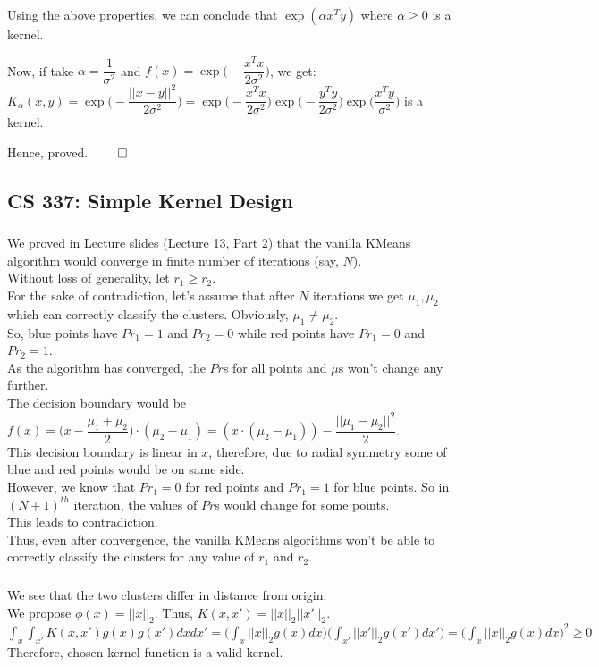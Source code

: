 \documentclass[12pt, fleqn]{article}
\begin{document}
Using the above properties, we can conclude that $\exp(\alpha x^T y)$ where $\alpha \ge 0$ is a kernel.

Now, if take $\alpha = \dfrac{1}{\sigma^2}$ and $f(x) = \exp\bigg(- \dfrac{x^T x}{2 \sigma^2}\bigg)$, we get: \\
$K_\alpha (x, y) = \exp\bigg(- \dfrac{||x - y||^2}{2 \sigma^2}\bigg) = \exp\bigg(- \dfrac{x^T x}{2 \sigma^2}\bigg) \exp\bigg(- \dfrac{y^T y}{2 \sigma^2}\bigg) \exp\bigg(\dfrac{x^T y}{\sigma^2}\bigg)$ is a kernel.

Hence, proved. \hfill $\qed$


\subsection{CS 337: Simple Kernel Design}
\subsubsection{}
We proved in Lecture slides (Lecture 13, Part 2) that the vanilla KMeans algorithm would converge in finite number of iterations (say, $N$). \\
Without loss of generality, let $r_1 \ge r_2$. \\
For the sake of contradiction, let's assume that after $N$ iterations we get ${\mu_1, \mu_2}$ which can correctly classify the clusters. Obviously, $\mu_1 \neq \mu_2$. \\
So, blue points have $Pr_1 = 1$ and $Pr_2 = 0$ while red points have $Pr_1 = 0$ and $Pr_2 = 1$. \\
As the algorithm has converged, the $Pr$s for all points and $\mu$s won't change any further. \\

The decision boundary would be $f(x) = \bigg(x - \dfrac{\mu_1 + \mu_2}{2}\bigg) \cdot (\mu_2 - \mu_1) = (x \cdot (\mu_2 - \mu_1)) - \dfrac{||\mu_1 - \mu_2||^2}{2}$. \\
This decision boundary is linear in $x$, therefore, due to radial symmetry some of blue and red points would be on same side. \\
However, we know that $Pr_1 = 0$ for red points and $Pr_1 = 1$ for blue points. So in $(N+1)^{th}$ iteration, the values of $Pr$s would change for some points. \\

This leads to contradiction. \\
Thus, even after convergence, the vanilla KMeans algorithms won't be able to correctly classify the clusters for any value of $r_1$ and $r_2$.

\subsubsection{}
We see that the two clusters differ in distance from origin. \\
We propose $\phi(x) = ||x||_2$. Thus, $K(x, x') = ||x||_2 ||x'||_2$. \\
$\int_x \int_{x'} K(x, x') g(x) g(x') dx dx' = \bigg( \int_x ||x||_2 g(x) dx \bigg) \bigg( \int_{x'} ||x'||_2 g(x') dx' \bigg) = \bigg( \int_x ||x||_2 g(x) dx \bigg)^2 \ge 0$ \\
Therefore, chosen kernel function is a valid kernel.
\end{document}

